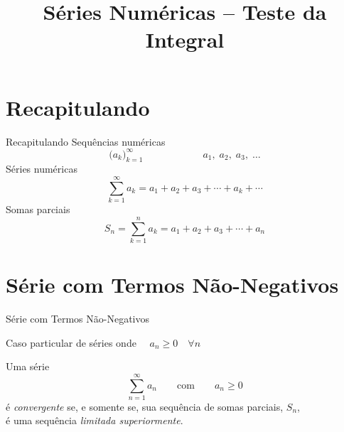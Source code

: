 
\usepackage{integracao_e_series}

\title{Séries Numéricas -- Teste da Integral}



\addtitle

\section{Recapitulando}

\begin{frame}{Recapitulando}
  Sequências numéricas
  \[
    \big( a_k \big)_{k=1}^\infty \qquad\qquad\qquad a_1,\; a_2,\; a_3,\; \dots
  \]
  \pause
  Séries numéricas
  \[
    \sum_{k=1}^\infty a_k = a_1 + a_2 + a_3 + \cdots + a_k + \cdots
  \]
  \pause
  Somas parciais
  \[
    S_n = \sum_{k=1}^n a_k = a_1 + a_2 + a_3 + \cdots + a_n
  \]
\end{frame}

\section{Série com Termos Não-Negativos}

\begin{frame}{Série com Termos Não-Negativos}

Caso particular de séries onde $\quad a_n \geq 0 \quad \forall n$

\pause
\vspace{\baselineskip}
Uma série
\[\sum_{n=1}^\infty a_n \qquad \text{com} \qquad a_n\geq 0 \]
é \emph{convergente} se, e somente se, sua sequência de somas parciais, $S_n$, \\
é uma sequência \emph{limitada superiormente}.
\end{frame}


